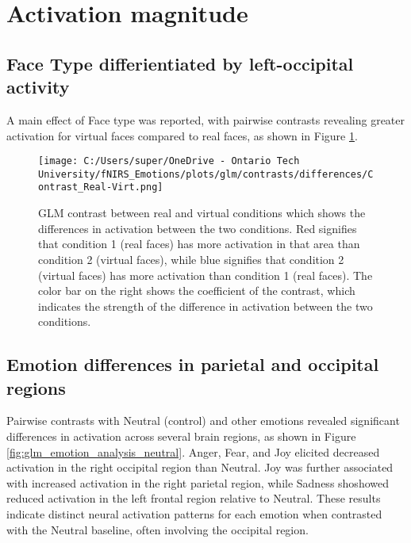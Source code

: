 \section{Activation magnitude}
\subsection{Face Type differientiated by left-occipital activity}

A main effect of Face type was reported, with pairwise contrasts revealing greater activation for virtual faces compared to real faces, as shown in Figure \ref{fig:glm_real_vs_virtual}.
\begin{figure}[H]
    \centering
      \texttt{[image: C:/Users/super/OneDrive - Ontario Tech University/fNIRS\_Emotions/plots/glm/contrasts/differences/Contrast\_Real-Virt.png]}
      \caption[GLM: Real vs. Virtual Faces]{GLM contrast between real and virtual conditions which shows the differences in activation between the two conditions.
      Red signifies that condition 1 (real faces) has more activation in that area than condition 2 (virtual faces), while blue signifies that condition 2 (virtual faces) has more activation than condition 1 (real faces).
      The color bar on the right shows the coefficient of the contrast, which indicates the strength of the difference in activation between the two conditions.}
      \label{fig:glm_real_vs_virtual}
\end{figure}

\subsection{Emotion differences in parietal and occipital regions}
Pairwise contrasts with Neutral (control) and other emotions revealed significant differences in activation across several brain regions, as shown in Figure \ref{fig:glm_emotion_analysis_neutral}. 
Anger, Fear, and Joy elicited decreased activation in the right occipital region than Neutral. 
Joy was further associated with increased activation in the right parietal region, while Sadness shoshowed reduced activation in the left frontal region relative to Neutral. 
These results indicate distinct neural activation patterns for each emotion when contrasted with the Neutral baseline, often involving the occipital region.

